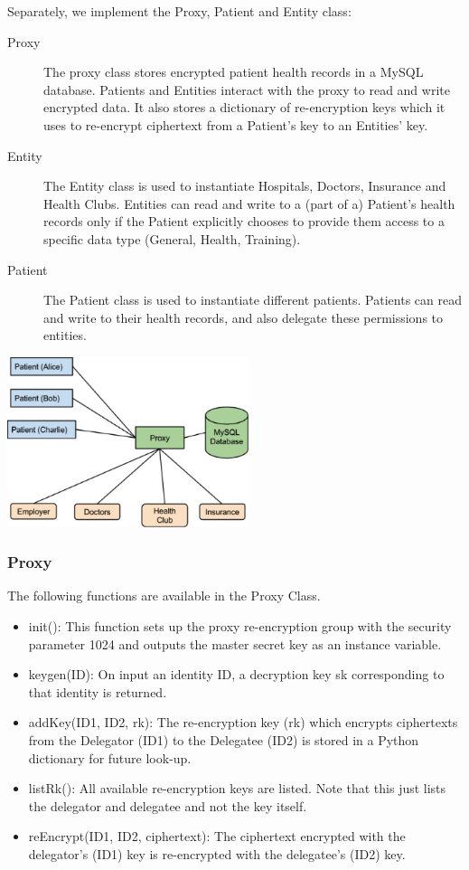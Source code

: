 \documentclass[]{article}
\begin{document}
Separately, we implement the Proxy, Patient and Entity class:
\begin{description}
\item[Proxy] The proxy class stores encrypted patient health records in a MySQL database. Patients and Entities interact with the proxy to read and write encrypted data. It also stores a dictionary of re-encryption keys which it uses to re-encrypt ciphertext from a Patient's key to an Entities’ key.
\item[Entity] The Entity class is used to instantiate Hospitals, Doctors, Insurance and Health Clubs. Entities can read and write to a (part of a) Patient's health records only if the Patient explicitly chooses to provide them access to a specific data type (General, Health, Training).
\item[Patient] The Patient class is used to instantiate different patients. Patients can read and write to their health records, and also delegate these permissions to entities.
\end{description}

\includegraphics[width=200pt]{implementationmodel.png}

\subsubsection{Proxy}
The following functions are available in the Proxy Class. 

\begin{itemize}
\item init(): This function sets up the proxy re-encryption group with the security parameter 1024 and outputs the master secret key as an instance variable.
\item keygen(ID): On input an identity ID, a decryption key sk corresponding to that identity is returned.
\item addKey(ID1, ID2, rk): The re-encryption key (rk) which encrypts ciphertexts from the Delegator (ID1) to the Delegatee (ID2) is stored in a Python dictionary for future look-up.
\item listRk(): All available re-encryption keys are listed. Note that this just lists the delegator and delegatee and not the key itself.
\item reEncrypt(ID1, ID2, ciphertext): The ciphertext encrypted with the delegator's (ID1) key is re-encrypted with the delegatee's (ID2) key.
\end{itemize}
\end{document}
